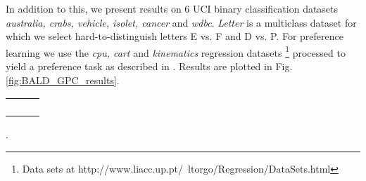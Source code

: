 \documentclass{article}
\newcommand{\ourmethod}{BALD } %
\begin{document}
In addition to this, we present results on 6 UCI binary classification datasets \emph{australia, crabs, vehicle, isolet, cancer} and \emph{wdbc}. \emph{Letter} is a multiclass dataset for which we select hard-to-distinguish letters E vs. F and D vs. P. For preference learning we use the \emph{cpu, cart} and \emph{kinematics} regression datasets \footnote{Data sets at http://www.liacc.up.pt/~ltorgo/Regression/DataSets.html} processed to yield a preference task as described in \cite{chu2005}. Results are plotted in Fig. \ref{fig:BALD_GPC_results}.


\begin{figure*}
\begin{center}
\begin{tabular}{ccc}
&
&
\\
&
&
\\
&
&
\\
&
&
\\
\end{tabular}
\end{center}
\caption{Classification accuracy on classification and preference learning datasets. Methods used are random query (\ref{plots:rand}), \ourmethod (\ref{plots:BALD}),  MES (\ref{plots:maxent}), QBC with 2 ($\mbox{QBC}_2$, \ref{plots:QBC2}) and 100 ($\mbox{QBC}_{100}$, \ref{plots:QBC100}) committee members, active SVM (\ref{plots:SVM}), IVM (\ref{plots:IVM}), decision theoretic \cite{kapoor2007} (\ref{plots:dec}), semi-supervised \cite{zhu2003} (\ref{plots:semi}) and empicial error (\ref{plots:emp}). The decision theoretic methods took a long time to run, so were not completed for all datasets. Plots (a-h) are GPC datasets, (i-k) are preference learning, plot (l) includes \ourmethod with hyperparameter learning (\ref{plots:opthyper})}.
\label{fig:BALD_GPC_results}
\end{figure*}
\end{document}
